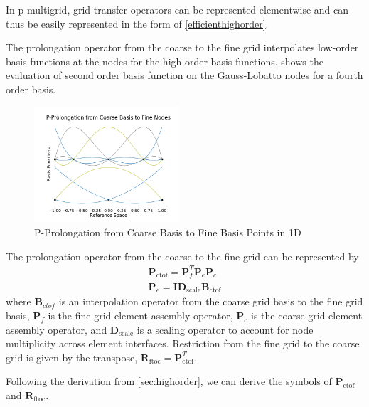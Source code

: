 \documentclass[review]{siamart190516}
\begin{document}
In p-multigrid, grid transfer operators can be represented elementwise and can thus be easily represented in the form of \cref{efficienthighorder}.

The prolongation operator from the coarse to the fine grid interpolates low-order basis functions at the nodes for the high-order basis functions.
 shows the evaluation of second order basis function on the Gauss-Lobatto nodes for a fourth order basis.

\begin{figure}[!ht]
  \centering
  \includegraphics[width=0.48\textwidth]{img/pProlongation}
  \caption{P-Prolongation from Coarse Basis to Fine Basis Points in 1D}
  \label{fig:p_prolongation}
\end{figure}

The prolongation operator from the coarse to the fine grid can be represented by
\begin{equation}
\begin{split}
\mathbf{P}_{\text{ctof}} = \mathbf{P}_f^T \mathbf{P}_e \mathbf{P}_c\\
\mathbf{P}_e = \mathbf{I} \mathbf{D}_{\text{scale}} \mathbf{B}_{\text{ctof}}
\end{split}
\end{equation}
where $\mathbf{B}_{ctof}$ is an interpolation operator from the coarse grid basis to the fine grid basis, $\mathbf{P}_f$ is the fine grid element assembly operator, $\mathbf{P}_c$ is the coarse grid element assembly operator, and $\mathbf{D}_{\text{scale}}$ is a scaling operator to account for node multiplicity across element interfaces.
Restriction from the fine grid to the coarse grid is given by the transpose, $\mathbf{R}_{\text{ftoc}} = \mathbf{P}_{\text{ctof}}^T$.

Following the derivation from \cref{sec:highorder}, we can derive the symbols of $\mathbf{P}_{\text{ctof}}$ and $\mathbf{R}_{\text{ftoc}}$.
\end{document}
